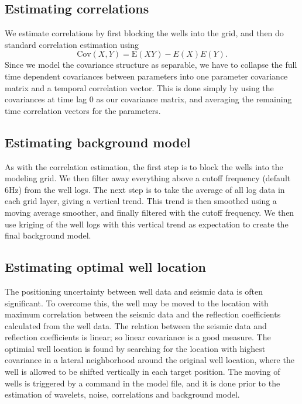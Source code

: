 \subsection{Estimating correlations}
\label{sec:correstimp}
We estimate correlations by first blocking the wells into the grid, and then do standard correlation estimation using
\begin{equation}
\text{Cov}(X,Y) = \text{E}(XY)-E(X)E(Y).
\end{equation}
Since we model the covariance structure as separable, we have to collapse the full time dependent covariances between parameters into one parameter covariance matrix and a temporal correlation vector. This is done simply by using the covariances at time lag 0 as our covariance matrix, and averaging the remaining time correlation vectors for the parameters.

\subsection{Estimating background model}
As with the correlation estimation, the first step is to block the wells into the modeling grid. We then filter away everything above a cutoff frequency (default 6Hz) from the well logs. The next step is to take the average of all log data in each grid layer, giving a vertical trend. This trend is then smoothed using a moving average smoother, and finally filtered with the cutoff frequency. We then use kriging of the well logs with this vertical trend as expectation to create the final background model.

\subsection{Estimating optimal well location}
The positioning uncertainty between well data and seismic data is often significant. To overcome this, the well may be moved to the location with maximum correlation between the seismic data and the reflection coefficients calculated from the well data. The relation between the seismic data and reflection coefficients is linear; so linear covariance is a good measure. The optimial well location is found by searching for the location with highest covariance in a lateral neighborhood around the original well location, where the well is allowed to be shifted vertically in each target position. The moving of wells is triggered by a command in the model file, and it is done prior to the estimation of wavelets, noise, correlations and background model.

